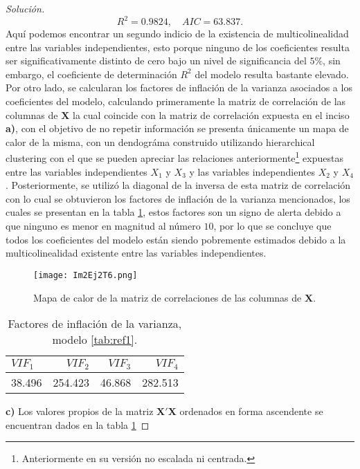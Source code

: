 \documentclass[10.5pt,notitlepage]{article}
\newenvironment{solucion}
  {\begin{proof}[Solución]}
  {\end{proof}}
\theoremstyle{plain}
\begin{document}
\begin{solucion}
\begin{equation}
    R^2 = 0.9824, \quad AIC = 63.837.
\end{equation}
Aquí podemos encontrar un segundo indicio de la existencia de multicolinealidad entre las variables independientes, esto porque ninguno de los coeficientes resulta ser significativamente distinto de cero bajo un nivel de significancia del \(5\%\), sin embargo, el coeficiente de determinación \(R^2\) del modelo resulta bastante elevado. Por otro lado, se calcularan los factores de inflación de la varianza asociados a los coeficientes del modelo, calculando primeramente la matriz de correlación de las columnas de \(\mathbf{X}\) la cual coincide con la matriz de correlación expuesta en el inciso \textbf{a)}, con el objetivo de no repetir información se presenta únicamente un mapa de calor de la misma, con un dendográma construido utilizando hierarchical clustering con el que se pueden apreciar las relaciones anteriormente\footnote{Anteriormente en su versión no escalada ni centrada.} expuestas entre las variables independientes \(X_1\) y \(X_3\) y las variables independientes \(X_2\) y \(X_4\). Posteriormente, se utilizó la diagonal de la inversa de esta matriz de correlación con lo cual se obtuvieron los factores de inflación de la varianza mencionados, los cuales se presentan en la tabla \ref{tab:ref11}, estos factores son un signo de alerta debido a que ninguno es menor en magnitud al número \(10\), por lo que se concluye que todos los coeficientes del modelo están siendo pobremente estimados debido a la multicolinealidad existente entre las variables independientes. 
\begin{figure}[htb]
 \centering
 \texttt{[image: Im2Ej2T6.png]}
 \caption{Mapa de calor de la matriz de correlaciones de las columnas de \(\mathbf{X}\).}
\label{fig:8}
\end{figure}
\begin{table}[H]
        \centering
        \begin{tabular}{@{}l@{\hskip 0.3in}r@{\hskip 0.3in}r@{\hskip 0.3in}r@{}}
            \toprule
            \(VIF_1\)& \(VIF_2\) & \(VIF_3\)& \(VIF_4\) \\
            \midrule
            38.496 &254.423  &46.868 &282.513 \\  
            \bottomrule
        \end{tabular}
        \caption{Factores de inflación de la varianza, modelo \ref{tab:ref1}.}
        \label{tab:ref11}
\end{table}
\noindent \textbf{c)} Los valores propios de la matriz \(\mathbf{X}'\mathbf{X}\) ordenados en forma ascendente se encuentran dados en la tabla \ref{tab:ref11}

\end{solucion}
\end{document}
